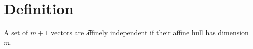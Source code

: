 

\section*{Definition}

A set of $m+1$ vectors are \t{affinely independent} if their affine hull has dimension $m$.

\blankpage